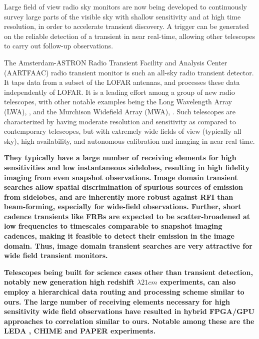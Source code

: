 \documentclass{ws-jai}
\begin{document}
Large field of  view radio sky monitors are now  being developed to continuously
survey large parts of the visible sky  with shallow sensitivity and at high time
resolution,  in order  to  accelerate  transient discovery.   A  trigger can  be
generated on the  reliable detection of a transient in  near real-time, allowing
other telescopes to carry out follow-up observations.


The  Amsterdam-ASTRON Radio  Transient Facility  and Analysis  Center (AARTFAAC)
radio transient  monitor is such  an all-sky  radio transient detector.  It taps
data from a subset of the LOFAR antennas, and processes these data independently
of LOFAR.  It  is a leading effort  among a group of new  radio telescopes, with
other   notable    examples   being    the   Long   Wavelength    Array   (LWA),
\cite{ellingsonLWA1},   and  the   Murchison   Widefield   Array  (MWA),   \cite
     {tingay2013murchison}.   Such   telescopes  are  characterized   by  having
     moderate resolution and sensitivity as compared to contemporary telescopes,
     but  with  extremely  wide  fields   of  view  (typically  all  sky),  high
     availability, and autonomous calibration and imaging in near real time.

\textbf  {They typically  have a  large number  of receiving  elements for  high
  sensitivities  and low  instantaneous  sidelobes, resulting  in high  fidelity
  imaging  from even  snapshot  observations.  Image  domain transient  searches
  allow spatial discrimination  of spurious sources of  emission from sidelobes,
  and are inherently  more robust against RFI than  beam-forming, especially for
  wide-field  observations.  Further,  short  cadence transients  like FRBs  are
  expected to be  scatter-broadened at low frequencies  to timescales comparable
  to snapshot imaging  cadences, making it feasible to detect  their emission in
  the image domain. Thus, image domain transient searches are very attractive for wide field transient monitors.}
     
\textbf  {Telescopes  being  built  for   science  cases  other  than  transient
  detection, notably new generation high redshift $\lambda21cm$ experiments, can
  also employ a hierarchical data routing and processing scheme similar to ours.
  The  large number  of receiving  elements necessary  for high  sensitivity wide
  field observations have resulted in  hybrid FPGA/GPU approaches to correlation
  similar to  ours.  Notable among  these are the  LEDA \citep{kocz2015digital},
  CHIME   \citep{bandura2014canadian}  and   PAPER  \citep{parsons2010precision}
  experiments.}
     
\end{document}
